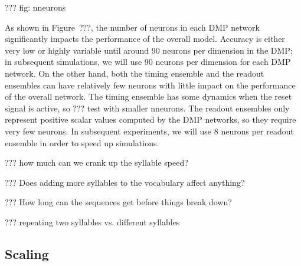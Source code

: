 ??? fig: nneurons

As shown in Figure~???,
the number of neurons in each DMP network
significantly impacts the performance
of the overall model.
Accuracy is either very low or
highly variable until around
90 neurons per dimension
in the DMP;
in subsequent simulations,
we will use 90 neurons per dimension
for each DMP network.
On the other hand,
both the timing ensemble
and the readout ensembles
can have relatively few neurons
with little impact on
the performance of the overall network.
The timing ensemble
has some dynamics when the reset signal is active,
so ??? test with smaller nneurons.
The readout ensembles
only represent positive scalar values
computed by the DMP networks,
so they require very few neurons.
In subsequent experiments,
we will use 8 neurons per readout ensemble
in order to speed up simulations.

??? how much can we crank up the syllable speed?

??? Does adding more syllables to the vocabulary affect anything?

??? How long can the sequences get before things break down?

??? repeating two syllables vs. different syllables

\subsection{Scaling}


